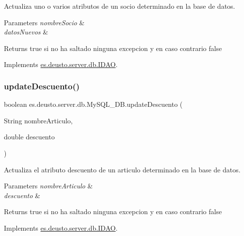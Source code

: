 Actualiza uno o varios atributos de un socio determinado en la base de datos. 
\begin{DoxyParams}{Parameters}
{\em nombre\+Socio} & \\
\hline
{\em datos\+Nuevos} & \\
\hline
\end{DoxyParams}
\begin{DoxyReturn}{Returns}
true si no ha saltado ninguna excepcion y en caso contrario false 
\end{DoxyReturn}


Implements \mbox{\hyperlink{interfacees_1_1deusto_1_1server_1_1db_1_1_i_d_a_o_a1e999400f9494d0860c70338fa87271b}{es.\+deusto.\+server.\+db.\+I\+D\+AO}}.

\mbox{\label{classes_1_1deusto_1_1server_1_1db_1_1_my_s_q_l___d_b_ad2208a15e02b51a82e8cbd9afd4ea939}} 
\subsubsection{\texorpdfstring{updateDescuento()}{updateDescuento()}}
{\footnotesize\ttfamily boolean es.\+deusto.\+server.\+db.\+My\+S\+Q\+L\+\_\+\+D\+B.\+update\+Descuento (\begin{DoxyParamCaption}\item[{String}]{nombre\+Articulo,  }\item[{double}]{descuento }\end{DoxyParamCaption})}

Actualiza el atributo descuento de un articulo determinado en la base de datos. 
\begin{DoxyParams}{Parameters}
{\em nombre\+Articulo} & \\
\hline
{\em descuento} & \\
\hline
\end{DoxyParams}
\begin{DoxyReturn}{Returns}
true si no ha saltado ninguna excepcion y en caso contrario false 
\end{DoxyReturn}


Implements \mbox{\hyperlink{interfacees_1_1deusto_1_1server_1_1db_1_1_i_d_a_o_acacb303b116d7f8f53b5b60f3e647203}{es.\+deusto.\+server.\+db.\+I\+D\+AO}}.

